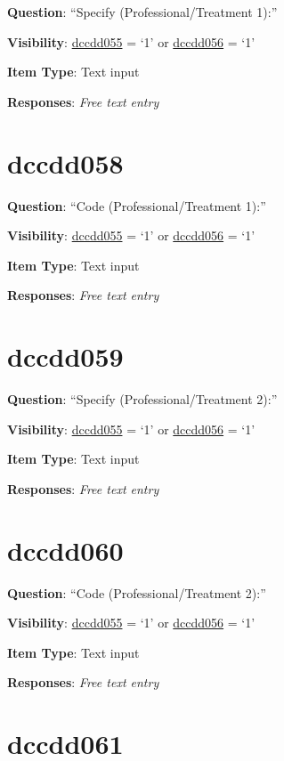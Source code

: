 \documentclass[]{book}
\begin{document}
\textbf{Question}: ``Specify (Professional/Treatment 1):''

\textbf{Visibility}: \protect\hyperlink{dccdd055}{dccdd055} = `1' or \protect\hyperlink{dccdd056}{dccdd056} = `1'

\textbf{Item Type}: Text input

\textbf{Responses}: \emph{Free text entry}

\hypertarget{dccdd058}{%
\section{dccdd058}\label{dccdd058}}

\textbf{Question}: ``Code (Professional/Treatment 1):''

\textbf{Visibility}: \protect\hyperlink{dccdd055}{dccdd055} = `1' or \protect\hyperlink{dccdd056}{dccdd056} = `1'

\textbf{Item Type}: Text input

\textbf{Responses}: \emph{Free text entry}

\hypertarget{dccdd059}{%
\section{dccdd059}\label{dccdd059}}

\textbf{Question}: ``Specify (Professional/Treatment 2):''

\textbf{Visibility}: \protect\hyperlink{dccdd055}{dccdd055} = `1' or \protect\hyperlink{dccdd056}{dccdd056} = `1'

\textbf{Item Type}: Text input

\textbf{Responses}: \emph{Free text entry}

\hypertarget{dccdd060}{%
\section{dccdd060}\label{dccdd060}}

\textbf{Question}: ``Code (Professional/Treatment 2):''

\textbf{Visibility}: \protect\hyperlink{dccdd055}{dccdd055} = `1' or \protect\hyperlink{dccdd056}{dccdd056} = `1'

\textbf{Item Type}: Text input

\textbf{Responses}: \emph{Free text entry}

\hypertarget{dccdd061}{%
\section{dccdd061}\label{dccdd061}}
\end{document}
